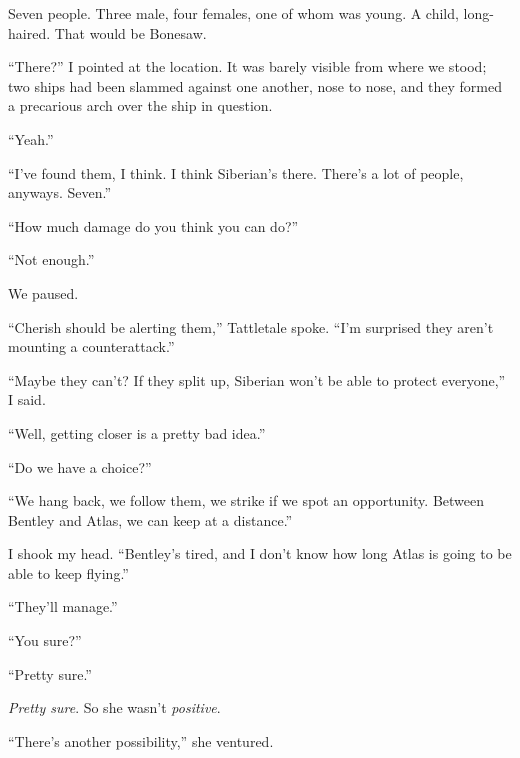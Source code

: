 Seven people.  Three male, four females, one of whom was young.  A child, long-haired.  That would be Bonesaw.



``There?''  I pointed at the location.  It was barely visible from where we stood; two ships had been slammed against one another, nose to nose, and they formed a precarious arch over the ship in question.



``Yeah.''



``I've found them, I think.  I think Siberian's there.  There's a lot of people, anyways.  Seven.''



``How much damage do you think you can do?''



``Not enough.''



We paused.



``Cherish should be alerting them,'' Tattletale spoke.  ``I'm surprised they aren't mounting a counterattack.''



``Maybe they can't?  If they split up, Siberian won't be able to protect everyone,'' I said.



``Well, getting closer is a pretty bad idea.''



``Do we have a choice?''



``We hang back, we follow them, we strike if we spot an opportunity.  Between Bentley and Atlas, we can keep at a distance.''



I shook my head.  ``Bentley's tired, and I don't know how long Atlas is going to be able to keep flying.''



``They'll manage.''



``You sure?''



``Pretty sure.''



\emph{Pretty sure}.  So she wasn't \emph{positive}.



``There's another possibility,'' she ventured.



